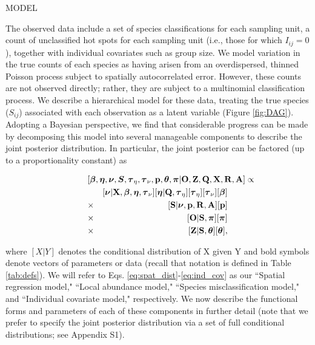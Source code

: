\documentclass[12pt,fleqn]{article}
\begin{document}
\begin{flushleft}
\vspace{.15in}
MODEL \\
\vspace{.15in}

The observed data include a set of species classifications for each sampling unit, a count of unclassified hot spots for each sampling unit (i.e., those for which $I_{ij}=0$), together with individual covariates such as group size.  We model variation in the true counts of each species as having arisen from an overdispersed, thinned Poisson process subject to spatially autocorrelated error.  However, these counts are not observed directly; rather, they are subject to a multinomial classification process. We describe a hierarchical model for these data, treating the true species ($S_{ij}$) associated with each observation as a latent variable (Figure \ref{fig:DAG}). Adopting a Bayesian perspective, we find that considerable progress can be made by decomposing this model into several manageable components to describe the joint posterior distribution.  In particular, the joint posterior can be factored (up to a proportionality constant) as
\begin{linenomath*}
\begin{eqnarray}
  \lefteqn{[\boldsymbol{\beta},\boldsymbol{\eta},\boldsymbol{\nu},\boldsymbol{S},\boldsymbol{\tau}_\eta,\boldsymbol{\tau}_\nu,
  {\bf p},\boldsymbol{\theta},\boldsymbol{\pi} | {\bf O},{\bf Z},{\bf Q},{\bf X},{\bf R},{\bf A}] \propto }
  \label{eq:joint_post}
  \\
  & & [\boldsymbol{\nu}|{\bf X},\boldsymbol{\beta},\boldsymbol{\eta},\boldsymbol{\tau}_\nu][\boldsymbol{\eta}|{\bf Q},\boldsymbol{\tau}_\eta][\boldsymbol{\tau}_\eta][\boldsymbol{\tau}_\nu][\boldsymbol{\beta}] \label{eq:spat_dist}\\
  & \times & [{\bf S} | \boldsymbol{\nu}, {\bf p},{\bf R},{\bf A}][{\bf p}] \\
  & \times & [{\bf O} | {\bf S},\boldsymbol{\pi}][\boldsymbol{\pi}]  \\
  & \times & [{\bf Z} | {\bf S},\boldsymbol{\theta}][\boldsymbol{\theta}], \label{eq:ind_cov}
\end{eqnarray}
\end{linenomath*}
where $[X|Y]$ denotes the conditional distribution of X given Y and bold symbols denote
vectors of parameters or data (recall that notation is defined in Table \ref{tab:defs}).
We will refer to Eqs. \ref{eq:spat_dist}-\ref{eq:ind_cov} as our ``Spatial regression model," ``Local abundance model," ``Species misclassification model," and ``Individual covariate model," respectively. We now describe the functional forms and parameters of each of these components in further detail (note that we prefer to specify the joint posterior distribution via a set of full conditional distributions; see Appendix S1).


\end{flushleft}
\end{document}
